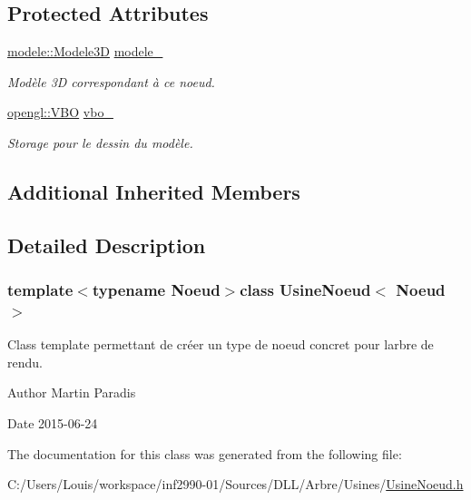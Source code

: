 \subsection*{Protected Attributes}
\begin{DoxyCompactItemize}
\item 
\hypertarget{class_usine_noeud_a41150bf720451994fc944328e5966de7}{}\hyperlink{classmodele_1_1_modele3_d}{modele\+::\+Modele3\+D} \hyperlink{class_usine_noeud_a41150bf720451994fc944328e5966de7}{modele\+\_\+}\label{class_usine_noeud_a41150bf720451994fc944328e5966de7}

\begin{DoxyCompactList}\small\item\em Modèle 3\+D correspondant à ce noeud. \end{DoxyCompactList}\item 
\hypertarget{class_usine_noeud_a255ba23be7c197be82afdd3e7de6a651}{}\hyperlink{classopengl_1_1_v_b_o}{opengl\+::\+V\+B\+O} \hyperlink{class_usine_noeud_a255ba23be7c197be82afdd3e7de6a651}{vbo\+\_\+}\label{class_usine_noeud_a255ba23be7c197be82afdd3e7de6a651}

\begin{DoxyCompactList}\small\item\em Storage pour le dessin du modèle. \end{DoxyCompactList}\end{DoxyCompactItemize}
\subsection*{Additional Inherited Members}


\subsection{Detailed Description}
\subsubsection*{template$<$typename Noeud$>$class Usine\+Noeud$<$ Noeud $>$}

Class template permettant de créer un type de noeud concret pour l\textquotesingle{}arbre de rendu. 

\begin{DoxyAuthor}{Author}
Martin Paradis 
\end{DoxyAuthor}
\begin{DoxyDate}{Date}
2015-\/06-\/24 
\end{DoxyDate}


The documentation for this class was generated from the following file\+:\begin{DoxyCompactItemize}
\item 
C\+:/\+Users/\+Louis/workspace/inf2990-\/01/\+Sources/\+D\+L\+L/\+Arbre/\+Usines/\hyperlink{_usine_noeud_8h}{Usine\+Noeud.\+h}\end{DoxyCompactItemize}
